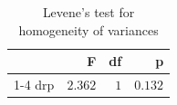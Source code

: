 \begin{table}[ht]
	\centering
	\caption{Levene's test for homogeneity of variances}
	\label{tab:levene}
	{
		\begin{tabular}{lrrr}
			\toprule
			    & F       & df  & p       \\
			\cmidrule[0.4pt]{1-4}
			drp & $2.362$ & $1$ & $0.132$ \\
			\bottomrule
		\end{tabular}
	}
\end{table}
